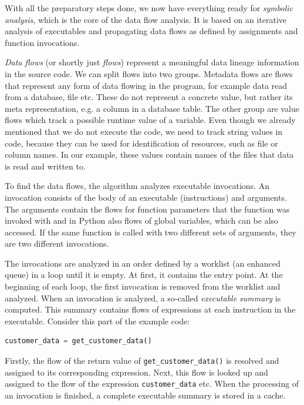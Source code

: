 With all the preparatory steps done, we now have everything ready for \textit{symbolic analysis}, which is the core of the data flow analysis. It is based on an iterative analysis of executables and propagating data flows as defined by assignments and function invocations.
\par
\textit{Data flows} (or shortly just \textit{flows}) represent a meaningful data lineage information in the source code. We can split flows into two groups. Metadata flows are flows that represent any form of data flowing in the program, for example data read from a database, file etc. These do not represent a concrete value, but rather its meta representation, e.g. a column in a database table. The other group are value flows which track a possible runtime value of a variable. Even though we already mentioned that we do not execute the code, we need to track string values in code, because they can be used for identification of resources, such as file or column names. In our example, these values contain names of the files that data is read and written to.
\par
To find the data flows, the algorithm analyzes executable invocations. An invocation consists of the body of an executable (instructions) and arguments. The arguments contain the flows for function parameters that the function was invoked with and in Python also flows of global variables, which can be also accessed. If the same function is called with two different sets of arguments, they are two different invocations.
\par
The invocations are analyzed in an order defined by a worklist (an enhanced queue) in a loop until it is empty. At first, it contains the entry point. At the beginning of each loop, the first invocation is removed from the worklist and analyzed. When an invocation is analyzed, a so-called \textit{executable summary} is computed. This summary contains flows of expressions at each instruction in the executable. Consider this part of the example code:
\begin{lstlisting}[language=Python] 
customer_data = get_customer_data()
\end{lstlisting}
Firstly, the flow of the return value of \texttt{get\_customer\_data()} is resolved and assigned to its corresponding expression. Next, this flow is looked up and assigned to the flow of the expression \texttt{customer\_data} etc. When the processing of an invocation is finished, a complete executable summary is stored in a cache.
\par
